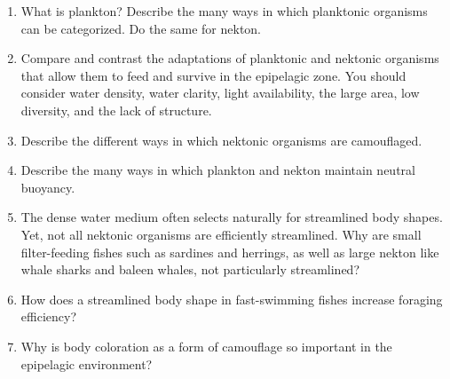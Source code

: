 \documentclass[nofonts, letterpaper]{tufte-handout}
\begin{document}
\begin{enumerate}

\item
  What is plankton? Describe the many ways in which planktonic organisms
  can be categorized. Do the same for nekton.
  
\item
  Compare and contrast the adaptations of planktonic and nektonic
  organisms that allow them to feed and survive in the epipelagic zone.
  You should consider water density, water clarity, light availability,
  the large area, low diversity, and the lack of structure.

\item
  Describe the different ways in which nektonic organisms are
  camouflaged.

\item
  Describe the many ways in which plankton and nekton maintain neutral
  buoyancy.

\item
  The dense water medium often selects naturally for streamlined body
  shapes. Yet, not all nektonic organisms are efficiently streamlined.
  Why are small filter-feeding fishes such as sardines and herrings, as
  well as large nekton like whale sharks and baleen whales, not
  particularly streamlined?
\item
  How does a streamlined body shape in fast-swimming fishes increase
  foraging efficiency?

\item
  Why is body coloration as a form of camouflage so important in the
  epipelagic environment?

 \end{enumerate}
\end{document}
